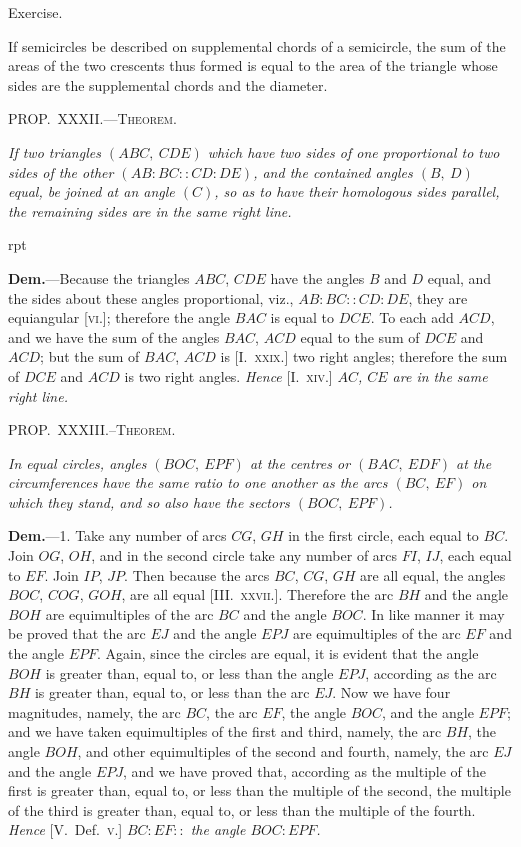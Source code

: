 \documentclass[oneside]{book}
\newcommand\mypropl[2]{
\bigskip\Needspace*{4\baselineskip}\begin{center}\textsc{#1}\end{center}
\hspace{\parindent}\emph{#2}\par\medskip
}
\newcommand\exhead[1]{
\Needspace*{5\baselineskip}\begin{center}
\textsf{#1}
\end{center}
}
\newcommand\imgflow[3]{
\setcounter{wrapwidth}{#1}
\begin{wrapfigure}[#2]{r}{\value{wrapwidth}pt}
\begin{center}
\vspace{-0.3in}
\end{center}
\end{wrapfigure}
}
\newcommand\imgcent[2]{
\begin{center}
\end{center}
}
\begin{document}
\exhead{Exercise.}

\begin{footnotesize}
If semicircles be described on supplemental chords of a semicircle,
the sum of the areas of the two crescents thus formed is
equal to the area of the triangle whose sides are the supplemental
chords and the diameter.
\par\end{footnotesize}


\mypropl{PROP\@.~XXXII\@.---Theorem.}{If two triangles $(ABC,\ CDE)$ which have two sides of
one proportional to two sides of the other $(AB : BC :: CD : DE)$,
and the contained angles $(B,\ D)$ equal, be joined at
an angle $(C)$, so as to have their homologous sides parallel,
the remaining sides are in the same right line.}

\imgflow{130}{7}{f211}

\textbf{Dem.}---Because the triangles $ABC$, $CDE$ have the
angles $B$ and $D$ equal, and
the sides about these angles
proportional, viz., $AB : BC :: CD : DE$,
they are equiangular
[\textsc{vi}.]; therefore the
angle $BAC$ is equal to $DCE$.
To each add $ACD$, and we have the sum of the angles $BAC$, $ACD$ equal to the
sum of $DCE$ and $ACD$; but the sum of $BAC$, $ACD$ is
[I.~\textsc{xxix}.] two right angles; therefore the sum of $DCE$
and $ACD$ is two right angles. \textit{Hence} [I.~\textsc{xiv}.] \textit{$AC$, $CE$
are in the same right line.}

\mypropl{PROP\@.~XXXIII\@.--Theorem.}{In equal circles, angles $(BOC,\ EPF)$ at the centres or
$(BAC,\ EDF)$ at the circumferences have the same ratio to
one another as the arcs $(BC,\ EF)$ on which they stand,
and so also have the sectors $(BOC,\ EPF)$.}

\imgcent{240}{f212}

\textbf{Dem.}---1. Take any number of arcs $CG$, $GH$ in the
first circle, each equal to $BC$. Join $OG$, $OH$, and in
the second circle take any number of arcs $FI$, $IJ$, each
equal to $EF$. Join $IP$, $JP$. Then because the arcs
$BC$, $CG$, $GH$ are all equal, the angles $BOC$, $COG$, $GOH$,
are all equal [III\@.~\textsc{xxvii.}]. Therefore the arc $BH$ and
the angle $BOH$ are equimultiples of the arc $BC$ and
the angle $BOC$. In like manner it may be proved
that the arc $EJ$ and the angle $EPJ$ are equimultiples
of the arc $EF$ and the angle $EPF$. Again, since the
circles are equal, it is evident that the angle $BOH$
is greater than, equal to, or less than the angle $EPJ$,
according as the arc $BH$ is greater than, equal to, or
less than the arc $EJ$. Now we have four magnitudes,
namely, the arc $BC$, the arc $EF$, the angle $BOC$, and
the angle $EPF$; and we have taken equimultiples of the
first and third, namely, the arc $BH$, the angle $BOH$,
and other equimultiples of the second and fourth,
namely, the arc $EJ$ and the angle $EPJ$, and we have
proved that, according as the multiple of the first is
greater than, equal to, or less than the multiple of the
second, the multiple of the third is greater than, equal
to, or less than the multiple of the fourth. \textit{Hence}
[V.\ Def.~\textsc{v.}] \textit{$BC: EF::$ the angle $BOC: EPF$.}
\end{document}
